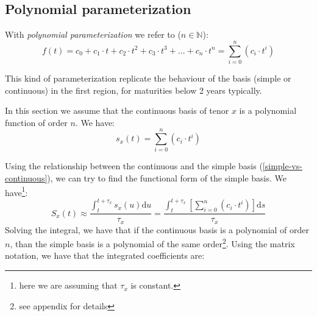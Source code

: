 \documentclass{article}
\begin{document}
\begin{appendices}
\label{app:Polynomial parameterization}
\subsection{Polynomial parameterization} 
With \textit{polynomial parameterization} we refer to ($ n \in \mathbb{N}$):
\begin{equation}
f(t) = c_0 + c_1\cdot t + c_2\cdot t^2 + c_3\cdot t^3 + ... + c_n\cdot t^n = \sum_{i=0}^{n}(c_i \cdot t^i)
\end{equation}

This kind of parameterization replicate the behaviour of the basis (simple or continuous) in the first region, for maturities below 2 years typically.

In this section we assume that the continuous basis of tenor $x$ is a polynomial function of order $n$. We have:
\begin{equation}
s_x(t) = \sum_{i=0}^{n}(c_i \cdot t^i)
\end{equation}

Using the relationship between the continuous and the simple basis (\ref{simple-vs-continuous}), we can try to find the functional form of the simple basis. We have\footnote{here we are assuming that $\tau_x$ is constant.}:
\begin{equation}
S_x(t) \approx \frac{\int_t^{t+\tau_x} s_x(u) \mathrm{d}u}{\tau_x} = \frac{\int_t^{t+\tau_x} [\sum_{i=0}^{n}(c_i \cdot t^i)] \mathrm{d}s}{\tau_x}
\end{equation}
Solving the integral, we have that if the continuous basis is a polynomial of order $n$, than the simple basis is a polynomial of the same order\footnote{see appendix for details}.
Using the matrix notation, we have that the integrated coefficients are:


\end{appendices}
\end{document}
